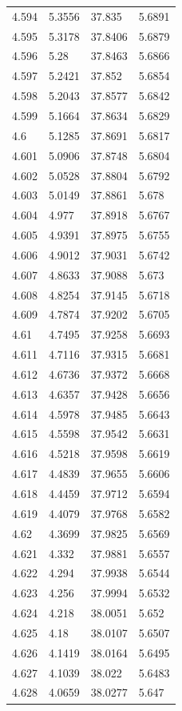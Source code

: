 \begin{tabular}{llll}
4.594 & 5.3556 & 37.835 & 5.6891 \\
4.595 & 5.3178 & 37.8406 & 5.6879 \\
4.596 & 5.28 & 37.8463 & 5.6866 \\
4.597 & 5.2421 & 37.852 & 5.6854 \\
4.598 & 5.2043 & 37.8577 & 5.6842 \\
4.599 & 5.1664 & 37.8634 & 5.6829 \\
4.6 & 5.1285 & 37.8691 & 5.6817 \\
4.601 & 5.0906 & 37.8748 & 5.6804 \\
4.602 & 5.0528 & 37.8804 & 5.6792 \\
4.603 & 5.0149 & 37.8861 & 5.678 \\
4.604 & 4.977 & 37.8918 & 5.6767 \\
4.605 & 4.9391 & 37.8975 & 5.6755 \\
4.606 & 4.9012 & 37.9031 & 5.6742 \\
4.607 & 4.8633 & 37.9088 & 5.673 \\
4.608 & 4.8254 & 37.9145 & 5.6718 \\
4.609 & 4.7874 & 37.9202 & 5.6705 \\
4.61 & 4.7495 & 37.9258 & 5.6693 \\
4.611 & 4.7116 & 37.9315 & 5.6681 \\
4.612 & 4.6736 & 37.9372 & 5.6668 \\
4.613 & 4.6357 & 37.9428 & 5.6656 \\
4.614 & 4.5978 & 37.9485 & 5.6643 \\
4.615 & 4.5598 & 37.9542 & 5.6631 \\
4.616 & 4.5218 & 37.9598 & 5.6619 \\
4.617 & 4.4839 & 37.9655 & 5.6606 \\
4.618 & 4.4459 & 37.9712 & 5.6594 \\
4.619 & 4.4079 & 37.9768 & 5.6582 \\
4.62 & 4.3699 & 37.9825 & 5.6569 \\
4.621 & 4.332 & 37.9881 & 5.6557 \\
4.622 & 4.294 & 37.9938 & 5.6544 \\
4.623 & 4.256 & 37.9994 & 5.6532 \\
4.624 & 4.218 & 38.0051 & 5.652 \\
4.625 & 4.18 & 38.0107 & 5.6507 \\
4.626 & 4.1419 & 38.0164 & 5.6495 \\
4.627 & 4.1039 & 38.022 & 5.6483 \\
4.628 & 4.0659 & 38.0277 & 5.647 \\

\end{tabular}
